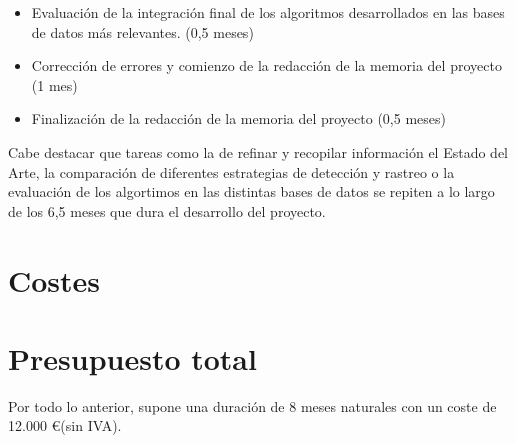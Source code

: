 \begin{itemize}
\item Evaluación de la integración final de los algoritmos desarrollados en las bases de datos más relevantes. (0,5 meses)

\item Corrección de errores y comienzo de la redacción de la memoria del proyecto (1 mes)

\item Finalización de la redacción de la memoria del proyecto (0,5 meses)
  
\end{itemize}

Cabe destacar que tareas como la de refinar y recopilar información el Estado del Arte, la comparación de diferentes estrategias de detección y rastreo o la evaluación de los algortimos en las distintas bases de datos se repiten a lo largo de los 6,5 meses que dura el desarrollo del proyecto.

\section{Costes}
\label{sec:costes-presupuesto}

\section{Presupuesto total}
\label{sec:presupuesto-total}

Por todo lo anterior, supone una duración de 8 meses naturales con un coste de 12.000 \euro (sin IVA).
